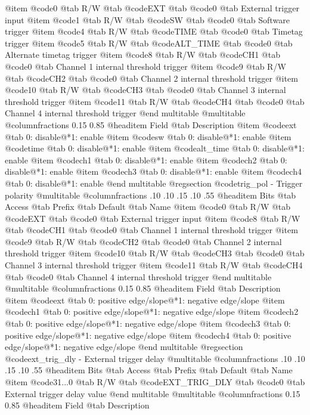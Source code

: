 @item @code{0}
@tab R/W @tab
@code{EXT}
@tab @code{0} @tab 
External trigger input
@item @code{1}
@tab R/W @tab
@code{SW}
@tab @code{0} @tab 
Software trigger
@item @code{4}
@tab R/W @tab
@code{TIME}
@tab @code{0} @tab 
Timetag trigger
@item @code{5}
@tab R/W @tab
@code{ALT_TIME}
@tab @code{0} @tab 
Alternate timetag trigger
@item @code{8}
@tab R/W @tab
@code{CH1}
@tab @code{0} @tab 
Channel 1 internal threshold trigger
@item @code{9}
@tab R/W @tab
@code{CH2}
@tab @code{0} @tab 
Channel 2 internal threshold trigger
@item @code{10}
@tab R/W @tab
@code{CH3}
@tab @code{0} @tab 
Channel 3 internal threshold trigger
@item @code{11}
@tab R/W @tab
@code{CH4}
@tab @code{0} @tab 
Channel 4 internal threshold trigger
@end multitable
@multitable @columnfractions 0.15 0.85
@headitem Field @tab Description
@item @code{ext} @tab 0: disable@*1: enable
@item @code{sw} @tab 0: disable@*1: enable
@item @code{time} @tab 0: disable@*1: enable
@item @code{alt_time} @tab 0: disable@*1: enable
@item @code{ch1} @tab 0: disable@*1: enable
@item @code{ch2} @tab 0: disable@*1: enable
@item @code{ch3} @tab 0: disable@*1: enable
@item @code{ch4} @tab 0: disable@*1: enable
@end multitable
@regsection @code{trig_pol} - Trigger polarity
@multitable @columnfractions .10 .10 .15 .10 .55
@headitem Bits @tab Access @tab Prefix @tab Default @tab Name
@item @code{0}
@tab R/W @tab
@code{EXT}
@tab @code{0} @tab 
External trigger input
@item @code{8}
@tab R/W @tab
@code{CH1}
@tab @code{0} @tab 
Channel 1 internal threshold trigger
@item @code{9}
@tab R/W @tab
@code{CH2}
@tab @code{0} @tab 
Channel 2 internal threshold trigger
@item @code{10}
@tab R/W @tab
@code{CH3}
@tab @code{0} @tab 
Channel 3 internal threshold trigger
@item @code{11}
@tab R/W @tab
@code{CH4}
@tab @code{0} @tab 
Channel 4 internal threshold trigger
@end multitable
@multitable @columnfractions 0.15 0.85
@headitem Field @tab Description
@item @code{ext} @tab 0: positive edge/slope@*1: negative edge/slope
@item @code{ch1} @tab 0: positive edge/slope@*1: negative edge/slope
@item @code{ch2} @tab 0: positive edge/slope@*1: negative edge/slope
@item @code{ch3} @tab 0: positive edge/slope@*1: negative edge/slope
@item @code{ch4} @tab 0: positive edge/slope@*1: negative edge/slope
@end multitable
@regsection @code{ext_trig_dly} - External trigger delay
@multitable @columnfractions .10 .10 .15 .10 .55
@headitem Bits @tab Access @tab Prefix @tab Default @tab Name
@item @code{31...0}
@tab R/W @tab
@code{EXT_TRIG_DLY}
@tab @code{0} @tab 
External trigger delay value
@end multitable
@multitable @columnfractions 0.15 0.85
@headitem Field @tab Description
